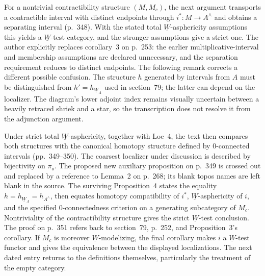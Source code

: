 For a nontrivial contractibility structure $(M,M_c)$, the next argument transports a contractible interval with distinct endpoints through $i^*:M\to A^{\wedge}$ and obtains a separating interval (p.~348). With the stated total $\underline W$-asphericity assumptions this yields a $\underline W$-test category, and the stronger assumptions give a strict one. The author explicitly replaces corollary~3 on p.~253: the earlier multiplicative-interval and membership assumptions are declared unnecessary, and the separation requirement reduces to distinct endpoints. The following remark corrects a different possible confusion. The structure $h$ generated by intervals from $A$ must be distinguished from $h'=h_{\underline W_A}$ used in section~79; the latter can depend on the localizer. The diagram's lower adjoint index remains visually uncertain between a heavily retraced shriek and a star, so the transcription does not resolve it from the adjunction argument.

Under strict total $\underline W$-asphericity, together with Loc~4, the text then compares both structures with the canonical homotopy structure defined by 0-connected intervals (pp.~349--350). The coarsest localizer under discussion is described by bijectivity on $\pi_o$. The proposed new auxiliary proposition on p.~349 is crossed out and replaced by a reference to Lemma~2 on p.~268; its blank topos names are left blank in the source. The surviving Proposition~4 states the equality $h=h_{\underline W_A}=h_{A^{\wedge}}$, then equates homotopy compatibility of $i^*$, $\underline W$-asphericity of $i$, and the specified 0-connectedness criterion on a generating subcategory of $M_c$. Nontriviality of the contractibility structure gives the strict $\underline W$-test conclusion. The proof on p.~351 refers back to section~79, p.~252, and Proposition~3's corollary. If $M_c$ is moreover $\underline W$-modelizing, the final corollary makes $i$ a $\underline W$-test functor and gives the equivalence between the displayed localizations. The next dated entry returns to the definitions themselves, particularly the treatment of the empty category.

